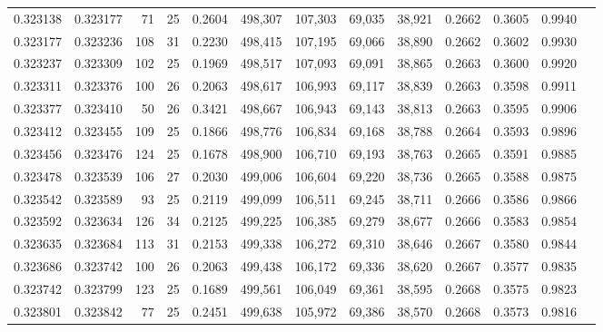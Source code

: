 \begin{tabular}{rrrrrrrrrrrrr}
0.323138 & 0.323177 &    71 &  25 &                                     0.2604 & 498,307 & 107,303 &  69,035 &  38,921 & 0.2662 & 0.3605 & 0.9940 \\
0.323177 & 0.323236 &   108 &  31 &                                     0.2230 & 498,415 & 107,195 &  69,066 &  38,890 & 0.2662 & 0.3602 & 0.9930 \\
0.323237 & 0.323309 &   102 &  25 &                                     0.1969 & 498,517 & 107,093 &  69,091 &  38,865 & 0.2663 & 0.3600 & 0.9920 \\
0.323311 & 0.323376 &   100 &  26 &                                     0.2063 & 498,617 & 106,993 &  69,117 &  38,839 & 0.2663 & 0.3598 & 0.9911 \\
0.323377 & 0.323410 &    50 &  26 &                                     0.3421 & 498,667 & 106,943 &  69,143 &  38,813 & 0.2663 & 0.3595 & 0.9906 \\
0.323412 & 0.323455 &   109 &  25 &                                     0.1866 & 498,776 & 106,834 &  69,168 &  38,788 & 0.2664 & 0.3593 & 0.9896 \\
0.323456 & 0.323476 &   124 &  25 &                                     0.1678 & 498,900 & 106,710 &  69,193 &  38,763 & 0.2665 & 0.3591 & 0.9885 \\
0.323478 & 0.323539 &   106 &  27 &                                     0.2030 & 499,006 & 106,604 &  69,220 &  38,736 & 0.2665 & 0.3588 & 0.9875 \\
0.323542 & 0.323589 &    93 &  25 &                                     0.2119 & 499,099 & 106,511 &  69,245 &  38,711 & 0.2666 & 0.3586 & 0.9866 \\
0.323592 & 0.323634 &   126 &  34 &                                     0.2125 & 499,225 & 106,385 &  69,279 &  38,677 & 0.2666 & 0.3583 & 0.9854 \\
0.323635 & 0.323684 &   113 &  31 &                                     0.2153 & 499,338 & 106,272 &  69,310 &  38,646 & 0.2667 & 0.3580 & 0.9844 \\
0.323686 & 0.323742 &   100 &  26 &                                     0.2063 & 499,438 & 106,172 &  69,336 &  38,620 & 0.2667 & 0.3577 & 0.9835 \\
0.323742 & 0.323799 &   123 &  25 &                                     0.1689 & 499,561 & 106,049 &  69,361 &  38,595 & 0.2668 & 0.3575 & 0.9823 \\
0.323801 & 0.323842 &    77 &  25 &                                     0.2451 & 499,638 & 105,972 &  69,386 &  38,570 & 0.2668 & 0.3573 & 0.9816 \\

\end{tabular}
